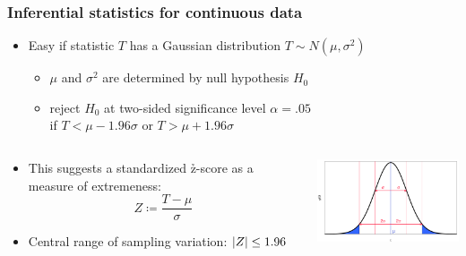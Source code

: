 \documentclass[t]{beamer} %
\begin{document}
\begin{frame}
  \frametitle{Inferential statistics for continuous data}
  
  \begin{itemize}
  \item Easy if statistic $T$ has a Gaussian distribution $T \sim N(\mu, \sigma^2)$
    \begin{itemize}
    \item $\mu$ and $\sigma^2$ are determined by null hypothesis $H_0$
    \item reject $H_0$ at two-sided significance level $\alpha = .05$\\
      if $T < \mu - 1.96\sigma$ or $T > \mu + 1.96\sigma$
    \end{itemize}
  \end{itemize}

  \begin{columns}[b]
    \begin{column}{55mm}
      \begin{itemize}
      \item<2-> This suggests a standardized \h{z-score} as a measure of extremeness:
        \[
        Z \coloneq \frac{T - \mu}{\sigma}
        \]
      \item<2-> Central range of sampling variation: $\lvert Z\rvert \leq 1.96$
      \end{itemize}
    \end{column}
    \begin{column}{45mm}
    \hspace*{-1cm}\includegraphics[width=55mm]{img/gaussian_parameters}      
    \end{column}
  \end{columns}
\end{frame}
\end{document}

